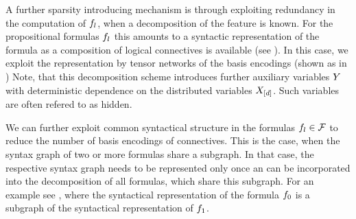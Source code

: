 A further sparsity introducing mechanism is through exploiting redundancy in the computation of $f_{l}$, when a decomposition of the feature is known.
For the propositional formulas $f_{l}$ this amounts to a syntactic representation of the formula as a composition of logical connectives is available (see ). %
In this case, we exploit the representation by tensor networks of the basis encodings (shown as  in )
Note, that this decomposition scheme introduces further auxiliary variables $Y$ with deterministic dependence on the distributed variables $X_{[d]}$.
Such variables are often refered to as hidden.

We can further exploit common syntactical structure in the formulas $f_{l}\in\mathcal{F}$ to reduce the number of basis encodings of connectives.
This is the case, when the syntax graph of two or more formulas share a subgraph.
In that case, the respective syntax graph needs to be represented only once an can be incorporated into the decomposition of all formulas, which share this subgraph.
For an example see , where the syntactical representation of the formula $f_{0}$ is a subgraph of the syntactical representation of $f_{1}$.





